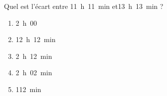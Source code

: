 Quel est l'écart entre 11~h~11~min et13~h~13~min ?
\begin{multicols}{5}
  \begin{enumerate}[A/]
  \item 2~h~00
  \item 12~h~12~min
  \item 2~h~12~min
  \item 2~h~02~min
  \item 112~min
  \end{enumerate}
\end{multicols}